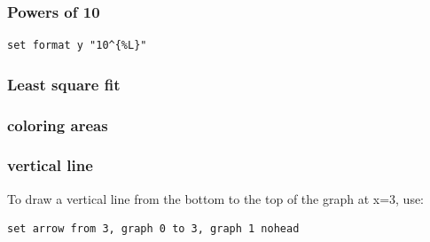 \subsubsection*{Powers of 10}

\begin{verbatim}
set format y "10^{%L}"
\end{verbatim}


\subsubsection*{Least square fit}


\subsubsection*{coloring areas}


\subsubsection*{vertical line}

To draw a vertical line from the bottom to the top of the graph at x=3, use: 
\begin{verbatim}
set arrow from 3, graph 0 to 3, graph 1 nohead
\end{verbatim}






